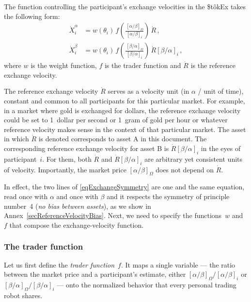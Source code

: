 \documentclass[letterpaper]{article}
\newcommand{\priceAB}{\left[\alpha / \beta\right]}
\newcommand{\priceBA}{\left[\beta / \alpha\right]}
\newcommand{\StokEx}{\$t\^{o}kEx}
\begin{document}
The function controlling the participant's exchange velocities in the \StokEx{} takes the following form:
\begin{align}
\dot{X}^\alpha_i &= w\!\left(\theta_i\right)\, f\!\left(\frac{\hspace{2pt}\priceAB_\Omega}{\priceAB_i} \right) \, \dot{R} \nonumber \, , \\
\dot{X}^\beta_i &=  w\!\left(\theta_i\right)\, f\!\left(\frac{\hspace{2pt}\priceBA_\Omega}{\priceBA_i} \right) \, \dot{R} \priceBA_i \,,
\label{eqExchangeSymmetry}
\end{align}
where $w$ is the weight function, $f$ is the trader function and $\dot{R}$ is the reference exchange velocity.

The reference exchange velocity $\dot{R}$ serves as a velocity unit (in $\alpha$ / unit of time), constant and common to all participants for this particular market. For example, in a market where gold is exchanged for dollars, the reference exchange velocity could be set to 1~dollar per second or 1~gram of gold per hour or whatever reference velocity makes sense in the context of that particular market. The asset in which $\dot{R}$ is denoted corresponds to asset A in this document. The corresponding reference exchange velocity for asset B is $\dot{R} \priceBA_i$ in the eyes of participant~$i$. For them, both $\dot{R}$ and $\dot{R} \priceBA_i$ are arbitrary yet consistent units of velocity. Importantly, the market price $\priceAB_\Omega$ does not depend on $\dot{R}$.

In effect, the two lines of \eqref{eqExchangeSymmetry} are one and the same equation, read once with $\alpha$ and once with $\beta$ and it respects the symmetry of principle number~4 (\emph{no bias between assets}), as we show in Annex~\ref{secReferenceVelocityBias}. Next, we need to specify the functions~$w$ and~$f$ that compose the exchange-velocity function.

\clearpage
\subsubsection{The trader function}

Let us first define the \emph{trader function}~$f$. It maps a single variable --- the ratio between the market price and a participant's estimate, either $\priceAB_\Omega / \priceAB_i$ or $\priceBA_\Omega / \priceBA_i$ --- onto the normalized behavior that every personal trading robot shares.
\end{document}
